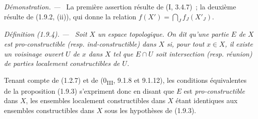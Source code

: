 \documentclass[10pt,oneside]{book}
\makeatletter
\newcommand{\setmanualcurrentlabel}[1]{\def\@currentlabel{#1}}
\newcommand{\oldpage}[2][]{%
  \setcounter{footnote}{0}%
  \marginpar{\scriptsize\textbf{#1}~|~#2}\ignorespaces}
\newenvironment{definition}[1][]{%
  \setmanualcurrentlabel{#1}\par\medskip\noindent\itshape Définition (#1). ---\ }{\par}
\newenvironment{proof}{%
  \par\medskip\noindent\textit{Démonstration. ---\ }}{\par}
\makeatother
\begin{document}
\begin{proof}
La première assertion résulte de (I, 3.4.7)~; la deuxième résulte de (1.9.2,
(ii)), qui donne la relation $f(X')=\bigcap_Jf_J(X'_J)$.
\end{proof}

\begin{definition}[1.9.4]
\label{IV.1.9.4-fr}
Soit $X$ un espace topologique. On dit qu'une partie $E$ de $X$ est
\emph{pro-constructible} (resp. \emph{ind-constructible}) dans $X$ si, pour
tout $x\in X$, il existe un voisinage ouvert $U$ de $x$ dans $X$ tel que
$E\cap U$ soit intersection (resp. réunion) de parties localement
constructibles de $U$.
\end{definition}

Tenant compte de (1.2.7) et de (0\textsubscript{III}, 9.1.8 et 9.1.12), les
conditions équivalentes de la proposition (1.9.3) s'expriment donc en disant
que $E$ est \emph{pro-constructible} dans $X$, les ensembles localement
constructibles dans $X$ étant identiques aux ensembles constructibles dans
$X$ sous les hypothèses de (1.9.3).

\oldpage[IV-1]{244}
\end{document}
